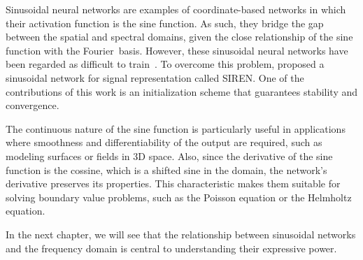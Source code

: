 Sinusoidal neural networks are examples of coordinate-based networks in which their activation function is the sine function. As such, they bridge the gap between the spatial and spectral domains, given the close relationship of the sine function with the Fourier~basis. However, these sinusoidal neural networks have been regarded as difficult to train~\citep{taming2017}. To overcome this problem, \citet{sitzmann2019siren} proposed a sinusoidal network for signal representation called SIREN. One of the contributions of this work is an initialization scheme that guarantees stability and convergence. 


The continuous nature of the sine function is particularly useful in applications where smoothness and differentiability of the output are required, such as modeling surfaces or fields in 3D space. Also, since the derivative of the sine function is the cossine, which is a shifted sine in the domain, the network's derivative preserves its properties. This characteristic makes them suitable for solving boundary value problems, such as the Poisson equation or the Helmholtz equation.





In the next chapter, we will see that the relationship between sinusoidal networks and the frequency domain is central to understanding their expressive power. 



